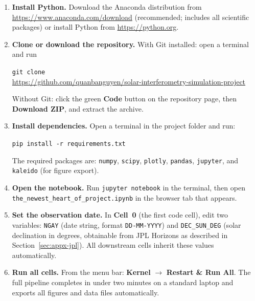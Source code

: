 \begin{enumerate}[leftmargin=1.8em, label=\textbf{Step \arabic*.}]
  \item \textbf{Install Python.}
        Download the Anaconda distribution from
        \url{https://www.anaconda.com/download} (recommended; includes all
        scientific packages) or install Python from \url{https://python.org}.

  \item \textbf{Clone or download the repository.}
        With Git installed: open a terminal and run
        \begin{center}
          \texttt{git clone}\\[0.2em]
          \url{https://github.com/quanbanguyen/solar-interferometry-simulation-project}
        \end{center}
        Without Git: click the green \textbf{Code} button on the repository
        page, then \textbf{Download ZIP}, and extract the archive.

  \item \textbf{Install dependencies.}
        Open a terminal in the project folder and run:
        \begin{center}
          \texttt{pip install -r requirements.txt}
        \end{center}
        The required packages are: \texttt{numpy}, \texttt{scipy},
        \texttt{plotly}, \texttt{pandas}, \texttt{jupyter}, and
        \texttt{kaleido} (for figure export).

  \item \textbf{Open the notebook.}
        Run \texttt{jupyter notebook} in the terminal, then open
        \texttt{the\_newest\_heart\_of\_project.ipynb} in the browser tab that
        appears.

  \item \textbf{Set the observation date.}
        In \textbf{Cell~0} (the first code cell), edit two variables:
        \texttt{NGAY} (date string, format \texttt{DD-MM-YYYY}) and
        \texttt{DEC\_SUN\_DEG} (solar declination in degrees, obtainable from
        JPL Horizons as described in Section~\ref{sec:appx-jpl}).  All
        downstream cells inherit these values automatically.

  \item \textbf{Run all cells.}
        From the menu bar: \textbf{Kernel} $\to$ \textbf{Restart \& Run All}.
        The full pipeline completes in under two minutes on a standard laptop
        and exports all figures and data files automatically.
\end{enumerate}

